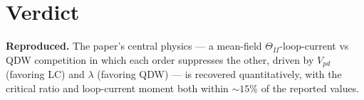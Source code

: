 \documentclass[11pt]{article}
\begin{document}
\section{Verdict}
\textbf{Reproduced.} The paper's central physics --- a mean-field
$\Theta_{II}$-loop-current vs QDW competition in which each order suppresses the
other, driven by $V_{pd}$ (favoring LC) and $\lambda$ (favoring QDW) --- is
recovered quantitatively, with the critical ratio and loop-current moment both
within $\sim15\%$ of the reported values.

\begin{center}
\end{center}
\end{document}
